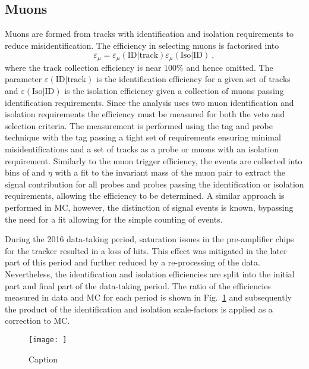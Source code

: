 \subsection{Muons}

Muons are formed from tracks with identification and isolation requirements to
reduce misidentification. The efficiency in selecting muons is factorised into
%
\begin{equation}
    \varepsilon_{\mu} = \varepsilon_{\mu}(\mathrm{ID}|\mathrm{track}) \varepsilon_{\mu}(\mathrm{Iso}|\mathrm{ID})\ ,
\end{equation}
%
where the track collection efficiency is near $100\%$ and hence omitted. The
parameter $\varepsilon(\mathrm{ID}|\mathrm{track})$ is the identification
efficiency for a given set of tracks and
$\varepsilon(\mathrm{Iso}|\mathrm{ID})$ is the isolation efficiency given a
collection of muons passing identification requirements. Since the analysis
uses two muon identification and isolation requirements the efficiency must be
measured for both the veto and selection criteria. The measurement is
performed using the tag and probe technique with the tag passing a tight set
of requirements ensuring minimal misidentifications and a set of tracks as a
probe or muons with an isolation requirement. Similarly to the muon trigger
efficiency, the events are collected into bins of \pt and $\eta$ with a fit to
the invariant mass of the muon pair to extract the signal contribution for all
probes and probes passing the identification or isolation requirements,
allowing the efficiency to be determined. A similar approach is performed in
MC, however, the distinction of signal events is known, bypassing the need for
a fit allowing for the simple counting of events.

During the 2016 data-taking period, saturation issues in the pre-amplifier
chips for the tracker resulted in a loss of hits. This effect was mitigated in
the later part of this period and further reduced by a re-processing of the
data. Nevertheless, the identification and isolation efficiencies are split
into the initial part and final part of the data-taking period. The ratio of
the efficiencies measured in data and MC for each period is shown in
Fig.~\ref{fig:muon-id-iso-efficiency} and subsequently the product of the
identification and isolation scale-factors is applied as a correction to MC.

\begin{figure}[htbp]
    \centering
    \texttt{[image: ]}
    \caption{Caption}
    \label{fig:muon-id-iso-efficiency}
\end{figure}


